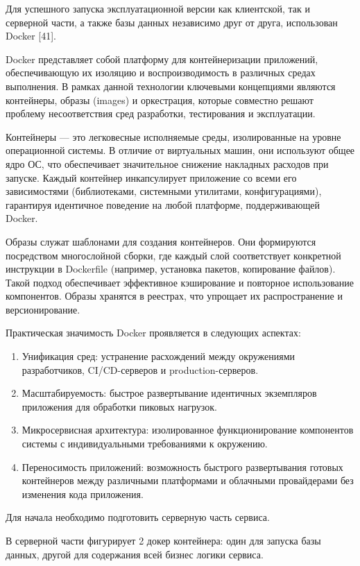 \documentclass[a4paper,14pt,oneside]{extreport}
\begin{document}
Для успешного запуска эксплуатационной версии как клиентской, так и серверной части, а также базы данных независимо друг от друга, использован Docker [41].

Docker представляет собой платформу для контейнеризации приложений, обеспечивающую их изоляцию и воспроизводимость в различных средах выполнения. В рамках данной технологии ключевыми концепциями являются контейнеры, образы (images) и оркестрация, которые совместно решают проблему несоответствия сред разработки, тестирования и эксплуатации.

Контейнеры — это легковесные исполняемые среды, изолированные на уровне операционной системы. В отличие от виртуальных машин, они используют общее ядро ОС, что обеспечивает значительное снижение накладных расходов при запуске. Каждый контейнер инкапсулирует приложение со всеми его зависимостями (библиотеками, системными утилитами, конфигурациями), гарантируя идентичное поведение на любой платформе, поддерживающей Docker.

Образы служат шаблонами для создания контейнеров. Они формируются посредством многослойной сборки, где каждый слой соответствует конкретной инструкции в Dockerfile (например, установка пакетов, копирование файлов). Такой подход обеспечивает эффективное кэширование и повторное использование компонентов. Образы хранятся в реестрах, что упрощает их распространение и версионирование.

Практическая значимость Docker проявляется в следующих аспектах:

\begin{enumerate}
    \item Унификация сред: устранение расхождений между окружениями разработчиков, CI/CD-серверов и production-серверов.
    \item Масштабируемость: быстрое развертывание идентичных экземпляров приложения для обработки пиковых нагрузок.
    \item Микросервисная архитектура: изолированное функционирование компонентов системы с индивидуальными требованиями к окружению.
    \item Переносимость приложений: возможность быстрого развертывания готовых контейнеров между различными платформами и облачными провайдерами без изменения кода приложения.
\end{enumerate}



Для начала необходимо подготовить серверную часть сервиса.

В серверной части фигурирует 2 докер контейнера: один для запуска базы данных, другой для содержания всей бизнес логики сервиса.
\end{document}
